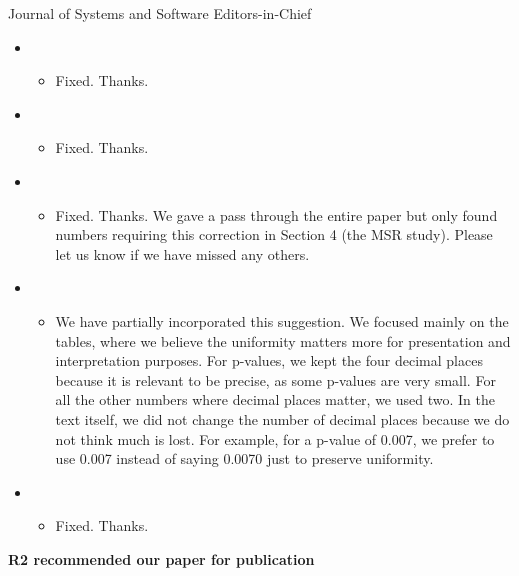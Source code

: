\documentclass{letter}
\begin{document}
\begin{letter}{Journal of Systems and Software Editors-in-Chief}
\begin{itemize}
\begin{itemize}
  \item {}
    \begin{itemize}
     \item Fixed. Thanks.
    \end{itemize}  
  \item {} 
    \begin{itemize}
      \item Fixed. Thanks. 
    \end{itemize}
  \item {}
    \begin{itemize}
      \item Fixed. Thanks. We gave a pass through the entire paper but only found numbers requiring this correction in Section 4 (the MSR study). Please let us know if we have missed any others. 
    \end{itemize}
 \item {}
   \begin{itemize}
   \item We have partially incorporated this suggestion. We focused mainly on the tables, where we believe the uniformity matters more for presentation and interpretation purposes. For p-values, we kept the four decimal places because it is relevant to be precise, as some p-values are very small. For all the other numbers where decimal places matter, we used two. In the text itself, we did not change the number of decimal places because we do not think much is lost. For example, for a p-value of 0.007, we prefer to use 0.007 instead of saying 0.0070 just to preserve uniformity.
  \end{itemize}   
 \item {}
  \begin{itemize}
    \item Fixed. Thanks.
  \end{itemize}  
\end{itemize}

\end{itemize}


{\bf R2 recommended our paper for publication}


\end{letter}
\end{document}
